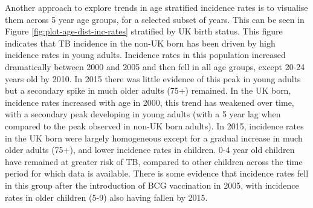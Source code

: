 \documentclass[11pt,twoside]{bristolthesis}
\begin{document}
  Another approach to explore trends in age stratified incidence rates is to visualise them across 5 year age groups, for a selected subset of years. This can be seen in Figure \ref{fig:plot-age-dist-inc-rates} stratified by UK birth status. This figure indicates that TB incidence in the non-UK born has been driven by high incidence rates in young adults. Incidence rates in this population increased dramatically between 2000 and 2005 and then fell in all age groups, except 20-24 years old by 2010. In 2015 there was little evidence of this peak in young adults but a secondary spike in much older adults (75+) remained. In the UK born, incidence rates increased with age in 2000, this trend has weakened over time, with a secondary peak developing in young adults (with a 5 year lag when compared to the peak observed in non-UK born adults). In 2015, incidence rates in the UK born were largely homogeneous except for a gradual increase in much older adults (75+), and lower incidence rates in children. 0-4 year old children have remained at greater risk of TB, compared to other children across the time period for which data is available. There is some evidence that incidence rates fell in this group after the introduction of BCG vaccination in 2005, with incidence rates in older children (5-9) also having fallen by 2015.
\end{document}
